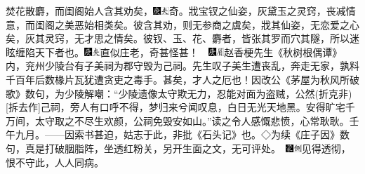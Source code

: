 {焚花散麝，而闺阁始人含其劝矣，{\includegraphics[width=3mm]{../Images/00004}\includegraphics[width=3mm]{../Images/00012}\footnotesize \kaishu 奇。}戕宝钗之仙姿，灰黛玉之灵窍，丧减情意，而闺阁之美恶始相类矣。彼含其劝，则无参商之虞矣，戕其仙姿，无恋爱之心矣，灰其灵窍，无才思之情矣。彼钗、玉、花、麝者，皆张其罗而穴其隧，所以迷眩缠陷天下者也。{\includegraphics[width=3mm]{../Images/00004}\includegraphics[width=3mm]{../Images/00012}\footnotesize \kaishu 直似庄老，奇甚怪甚！　{\includegraphics[width=3mm]{../Images/00004}\includegraphics[width=3mm]{../Images/00010}\footnotesize \kaishu 赵香梗先生《秋树根偶谭》内，兖州少陵台有子美祠为郡守毁为己祠。先生叹子美生遭丧乱，奔走无家，孰料千百年后数椽片瓦犹遭贪吏之毒手。甚矣，才人之厄也！因改公《茅屋为秋风所破歌》数句，为少陵解嘲：``少陵遗像太守欺无力，忍能对面为盗贼，公然{(折克非)}{[}拆去作{]}己祠，旁人有口呼不得，梦归来兮闻叹息，白日无光天地黑。安得旷宅千万间，太守取之不尽生欢颜，公祠免毁安如山。''读之令人感慨悲愤，心常耿耿。壬午九月。------因索书甚迫，姑志于此，非批《石头记》也。◇为续《庄子因》数句，真是打破胭脂阵，坐透红粉关，另开生面之文，无可评处。　}\includegraphics[width=3mm]{../Images/00006}\includegraphics[width=3mm]{../Images/00011}\footnotesize \kaishu 见得透彻，恨不守此，人人同病。}

}
